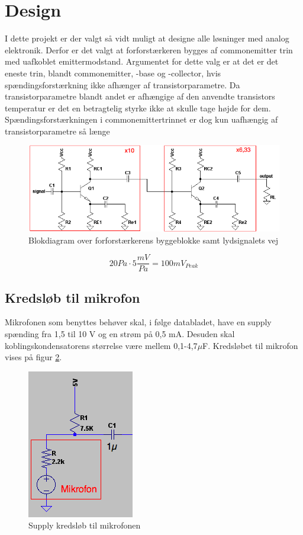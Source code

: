 \section{Design}
I dette projekt er der valgt så vidt muligt at designe alle løsninger med analog elektronik. Derfor er det valgt at forforstærkeren bygges af commonemitter trin med uafkoblet emittermodstand. 
Argumentet for dette valg er at det er det eneste trin, blandt commonemitter, -base og -collector, hvis spændingsforstærkning ikke afhænger af transistorparametre. Da transistorparametre blandt andet er afhængige af den anvendte transistors temperatur er det en betragtelig styrke ikke at skulle tage højde for dem. Spændingsforstærkningen i commonemittertrinnet er dog kun uafhængig af transistorparametre så længe 

\begin{figure}[h]
\centering
\includegraphics[scale=.6]{teknisk/forforstaerker/blok_forforstaerker.png}
\caption{Blokdiagram over forforstærkerens byggeblokke samt lydsignalets vej}
\label{blok_forforstaerker}
\end{figure}



\begin{equation}
20 Pa \cdot 5 \frac{mV}{Pa} = 100 mV_{Peak}
\label{eq:mikrofonoutput}
\end{equation}

\subsection*{Kredsløb til mikrofon}

Mikrofonen som benyttes behøver skal, i følge databladet, have en supply spænding fra 1,5 til 10 V og en strøm på 0,5 mA. Desuden skal koblingskondensatorens størrelse være mellem 0,1-4,7$\mu$F. Kredsløbet til mikrofon vises på figur \ref{fig:mikrofonkreds}. 

\begin{figure}[h]
\centering
\includegraphics[scale=.6]{teknisk/forforstaerker/mikrofonkreds.png}
\caption{Supply kredsløb til mikrofonen}
\label{fig:mikrofonkreds}
\end{figure}

